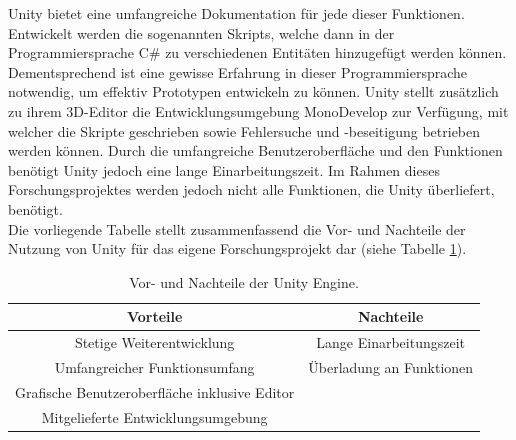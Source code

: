 \documentclass[a4paper,12pt,oneside]{article}
\begin{document}
        Unity bietet eine umfangreiche Dokumentation für jede dieser Funktionen.
        Entwickelt werden die sogenannten Skripts, welche dann in der Programmiersprache
        C\# zu verschiedenen Entitäten hinzugefügt werden können. Dementsprechend ist eine
        gewisse Erfahrung in dieser Programmiersprache notwendig, um effektiv Prototypen
        entwickeln zu können. 
        Unity stellt zusätzlich zu ihrem 3D-Editor die 
        Entwicklungsumgebung MonoDevelop zur Verfügung, mit welcher die Skripte 
        geschrieben sowie Fehlersuche und -beseitigung betrieben werden können.
        Durch die umfangreiche Benutzeroberfläche und den Funktionen benötigt Unity jedoch 
        eine lange Einarbeitungszeit. 
        Im Rahmen dieses Forschungsprojektes werden jedoch nicht alle Funktionen,
        die Unity überliefert, benötigt. \\
        Die vorliegende Tabelle stellt zusammenfassend die Vor- und Nachteile der Nutzung
        von Unity für das eigene Forschungsprojekt dar (siehe Tabelle \ref{tab:vor-und-nachteile-unity}).
        \begin{table}[t]
          \begin{center}
            \begin{tabular}{| c | c |}
              \hline
              \textbf{Vorteile} & \textbf{Nachteile} \\ \hline
              Stetige Weiterentwicklung & Lange Einarbeitungszeit \\ \hline
              Umfangreicher Funktionsumfang & Überladung an Funktionen \\ \hline
              Grafische Benutzeroberfläche inklusive Editor & \\ \hline
              Mitgelieferte Entwicklungsumgebung & \\
              \hline
            \end{tabular}
            \caption{Vor- und Nachteile der Unity Engine.\label{tab:vor-und-nachteile-unity}}
          \end{center}
        \end{table}
        \newpage
\end{document}
